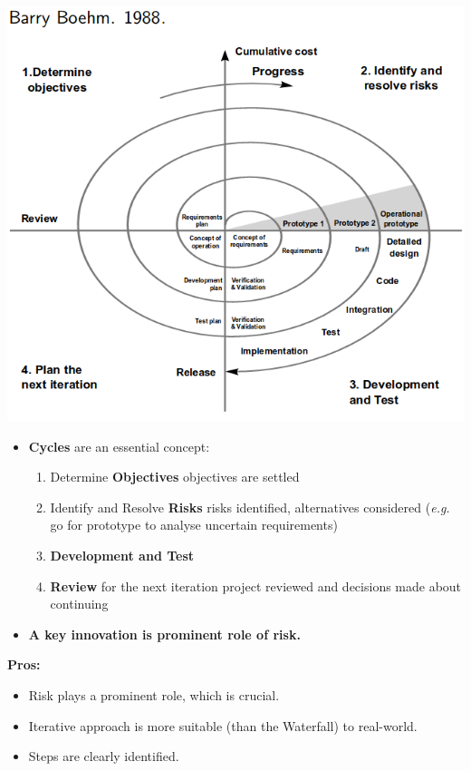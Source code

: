 \documentclass[a4paper]{article}
\providecommand{\tightlist}{%
  \setlength{\itemsep}{0pt}\setlength{\parskip}{0pt}}
\begin{document}
\includegraphics{2C-SE.assets/1543143069292.png}

\begin{itemize}
\tightlist
\item
  \textbf{Cycles} are an essential concept:

  \begin{enumerate}
  \def\labelenumi{\arabic{enumi}.}
  \tightlist
  \item
    Determine \textbf{Objectives} objectives are settled
  \item
    Identify and Resolve \textbf{Risks} risks identified, alternatives
    considered (\emph{e.g.} go for prototype to analyse uncertain
    requirements)
  \item
    \textbf{Development and Test}
  \item
    \textbf{Review} for the next iteration project reviewed and
    decisions made about continuing
  \end{enumerate}
\item
  \textbf{A key innovation is prominent role of risk.}
\end{itemize}

\textbf{Pros:}

\begin{itemize}
\tightlist
\item
  Risk plays a prominent role, which is crucial.
\item
  Iterative approach is more suitable (than the Waterfall) to
  real-world.
\item
  Steps are clearly identified.
\end{itemize}
\end{document}
